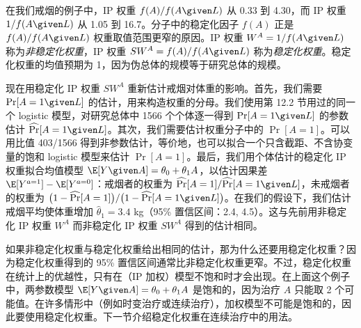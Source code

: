 在我们戒烟的例子中，IP 权重 $f(A)/f(A\given L)$ 从 0.33 到 4.30，而 IP 权重 $1/f(A\given L)$ 从 1.05 到 16.7。分子中的稳定化因子 $f(A)$ 正是 $f(A)/f(A\given L)$ 权重取值范围更窄的原因。IP 权重 $W^{A}=1/f(A\given L)$ 称为\emph{非稳定化权重}，IP 权重 $SW^{A}=f(A)/f(A\given L)$ 称为\emph{稳定化权重}。稳定化权重的均值预期为 1，因为伪总体的规模等于研究总体的规模。

现在用稳定化 IP 权重 $SW^{A}$ 重新估计戒烟对体重的影响。首先，我们需要 $\Pr[A=1\given L]$ 的估计，用来构造权重的分母。我们使用第 12.2 节用过的同一个 logistic 模型，对研究总体中 1566 个个体逐一得到 $\Pr[A=1\given L]$ 的参数估计 $\widehat{\Pr}[A=1\given L]$。其次，我们需要估计权重分子中的 $\Pr[A=1]$。可以用比值 403/1566 得到非参数估计，等价地，也可以拟合一个只含截距、不含协变量的饱和 logistic 模型来估计 $\Pr[A=1]$。最后，我们用个体估计的稳定化 IP 权重拟合均值模型 $\E[Y\given A]=\theta_0+\theta_1A$，以估计因果差 $\E[Y^{a=1}]-\E[Y^{a=0}]$：戒烟者的权重为 $\widehat{\Pr}[A=1]/\widehat{\Pr}[A=1\given L]$，未戒烟者的权重为 $\bigl(1-\widehat{\Pr}[A=1]\bigr)/\bigl(1-\widehat{\Pr}[A=1\given L]\bigr)$。在我们的假设下，我们估计戒烟平均使体重增加 $\hat\theta_1=3.4$ kg（95\% 置信区间：2.4, 4.5）。这与先前用非稳定化 IP 权重 $W^{A}$ 而非稳定化 IP 权重 $SW^{A}$ 得到的估计相同。

如果非稳定化权重与稳定化权重给出相同的估计，那为什么还要用稳定化权重？因为稳定化权重得到的 95\% 置信区间通常比非稳定化权重更窄。不过，稳定化权重在统计上的优越性，只有在（IP 加权）模型不饱和时才会出现。在上面这个例子中，两参数模型 $\E[Y\given A]=\theta_0+\theta_1A$ 是饱和的，因为治疗 $A$ 只能取 2 个可能值。在许多情形中（例如时变治疗或连续治疗），加权模型不可能是饱和的，因此要使用稳定化权重。下一节介绍稳定化权重在连续治疗中的用法。

